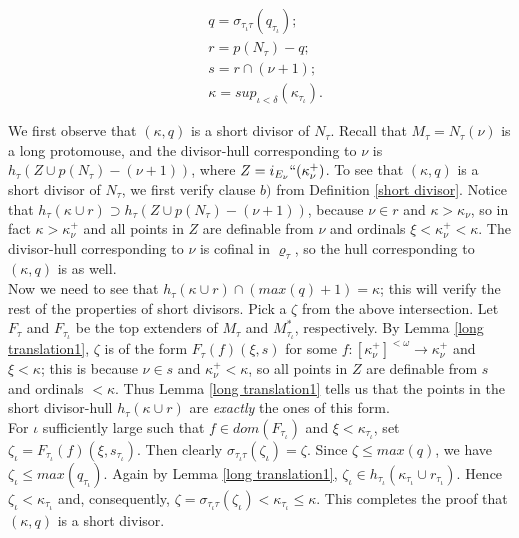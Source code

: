 \documentclass[12pt]{article}
\begin{document}
\[
\begin{split}
& q = \sigma_{\tau_\iota \tau } ( q_{\tau_\iota} ) ; \\
& r = p(N_\tau) - q ; \\
& s = r \cap ( \nu + 1) ; \\
& \kappa = sup_{\iota < \delta} ( \kappa_{\tau_\iota} ) .
\end{split}
\]

We first observe that $(\kappa , q )$ is a short divisor of $N_\tau$.  Recall that $M_\tau = N_\tau ( \nu)$ is a long protomouse, and the divisor-hull corresponding to $\nu$ is $h_\tau ( Z \cup p(N_\tau) - (\nu + 1))$, where $Z = i_{E_\nu}`` (\kappa_\nu^+ )$.  To see that $( \kappa , q )$ is a short divisor of $N_\tau$, we first verify clause $b)$ from Definition \ref{short divisor}.  Notice that $h_\tau ( \kappa \cup r ) \supset h_\tau ( Z \cup p(N_\tau) - (\nu + 1))$, because $\nu \in r$ and $\kappa > \kappa_\nu$, so in fact $\kappa > \kappa_\nu^+$ and all points in $Z$ are definable from $\nu$ and ordinals $\xi < \kappa_\nu^+ < \kappa$.  The divisor-hull corresponding to $\nu$ is cofinal in $\varrho_\tau$, so the hull corresponding to $(\kappa , q )$ is as well.\\

Now we need to see that $h_\tau ( \kappa \cup r) \cap ( max (q) +1 ) = \kappa$; this will verify the rest of the properties of short divisors.  Pick a $\zeta$ from the above intersection.  Let $F_\tau$ and $F_{\tau_\iota}$ be the top extenders of $M_\tau$ and $M_{\tau_\iota}^*$, respectively.  By Lemma \ref{long translation1}, $\zeta$ is of the form $F_\tau (f) ( \xi , s )$ for some $f : [\kappa_\nu^+]^{< \omega} \longrightarrow \kappa_\nu^+$ and $\xi < \kappa$; this is because $\nu \in s$ and $\kappa_\nu^+ < \kappa$, so all points in $Z$ are definable from $s$ and ordinals $< \kappa$.  Thus Lemma \ref{long translation1} tells us that the points in the short divisor-hull $h_\tau ( \kappa \cup r )$ are \textit{exactly} the ones of this form.\\



For $\iota$ sufficiently large such that $f \in dom ( F_{\tau_\iota})$ and $\xi < \kappa_{\tau_\iota}$, set $\zeta_\iota = F_{\tau_\iota} (f) (\xi , s_{\tau_\iota} )$.  Then clearly $\sigma_{\tau_\iota \tau } ( \zeta_\iota ) = \zeta$.  Since $\zeta \leq max (q)$, we have $\zeta_\iota \leq max ( q_{\tau_\iota})$.  Again by Lemma \ref{long translation1}, $\zeta_\iota \in h_{\tau_\iota} ( \kappa_{\tau_\iota} \cup r_{\tau_\iota} )$.  Hence $\zeta_\iota < \kappa_{\tau_\iota}$ and, consequently, $\zeta = \sigma_{\tau_\iota \tau} ( \zeta_\iota ) < \kappa_{\tau_\iota} \leq \kappa$.  This completes the proof that $( \kappa , q)$ is a short divisor.\\
\end{document}
